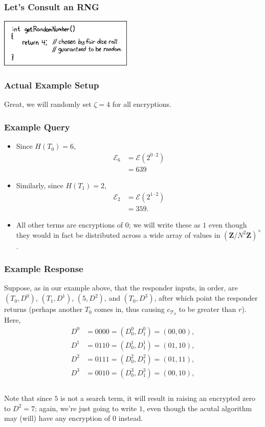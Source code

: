 \documentclass{beamer}
\makeatletter
\newcommand{\Z}{\ensuremath{\mathbf{Z}}}
\newcommand{\zmodntunits}{\ensuremath{\left(\Z/N^{2}\Z\right)^{\times}}}
\DeclareRobustCommand*{\&}{%
  \nfss@text{%
    \fontfamily{LinuxBiolinumT-TLF}%
    \selectfont
    \symbol{`\&}%
  }%
}
\makeatother
\begin{document}
\begin{frame}
  \frametitle{Let's Consult an RNG}
  \begin{center}
  \includegraphics[width=2.5in,keepaspectratio]{random_number.png}
\end{center}
\bigskip {}
\end{frame}

\begin{frame}
  \frametitle{Actual Example Setup}
  Great, we will randomly set $\zeta = 4$ for all encryptions.
\end{frame}

\begin{frame}
  \frametitle{Example Query}
  \begin{itemize}
    \item Since $H(T_0) = 6$, 
      \begin{align*}
        \mathcal{E}_6 &= \mathcal{E}(2^{0\cdot2})\\
          &= 639
      \end{align*}
    \item Similarly, since $H(T_1) = 2$, 
      \begin{align*}
        \mathcal{E}_2 &= \mathcal{E}(2^{1\cdot2})\\
          &= 359.
      \end{align*}
    \item All other terms are encryptions of $0$; we will write these as $1$
      even though they would in fact be distributed across a wide array of
      values in \zmodntunits.
  \end{itemize}
\end{frame}


\begin{frame}
  \frametitle{Example Response}
  Suppose, as in our example above, that the responder inputs, in order, are
  $(T_0,D^0)$, $(T_1,D^1)$, $(5, D^2)$, and $(T_0,D^3)$, after
  which point the responder returns (perhaps another $T_0$ comes in, thus causing
  $c_{\mathcal{T}_0}$ to be greater than $r$). Here, 
  \begin{align*}
    D^0 &= 0000 = (D^0_0, D^0_1) = (00, 00),\\
    D^1 &= 0110 = (D^1_0, D^1_1) = (01, 10),\\
    D^2 &= 0111 = (D^2_0, D^2_1) = (01, 11),\\
    D^3 &= 0010 = (D^3_0, D^3_1) = (00, 10),\\
  \end{align*}~\\

  Note that since $5$ is not a search term, it will result in raising an
 encrypted zero to $D^2=7$; again, we're just going to write $1$, even though the
  acutal algorithm may (will) have any encryption of $0$ instead.
\end{frame}
\end{document}
